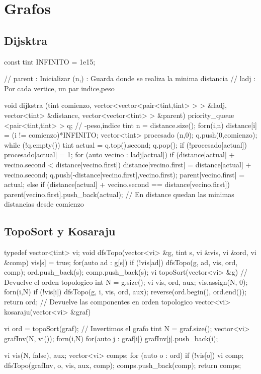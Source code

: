 \section{Grafos}

\subsection{Dijsktra}
\begin{code}
const tint INFINITO = 1e15;

// parent : Inicializar (n,{}) : Guarda donde se realiza la minima distancia
// ladj : Por cada vertice, un par {indice,peso}

void dijkstra (tint comienzo, vector<vector<pair<tint,tint> > > &ladj, 
vector<tint> &distance, vector<vector<tint> > &parent) {
	priority_queue <pair<tint,tint> > q; // {-peso,indice}
	tint n = distance.size();
	forn(i,n)
		distance[i] = (i != comienzo)*INFINITO;
	vector<tint> procesado (n,0);
	q.push({0,comienzo});
	while (!q.empty()) {
		tint actual = q.top().second;
		q.pop();
		if (!procesado[actual]) {
			procesado[actual] = 1;
			for (auto vecino : ladj[actual]) {
				if (distance[actual] + vecino.second < distance[vecino.first]) {
					distance[vecino.first] = distance[actual] + vecino.second;
					q.push({-distance[vecino.first],vecino.first});
					parent[vecino.first] = {actual};
				}
				else if (distance[actual] + vecino.second == distance[vecino.first])
					parent[vecino.first].push_back(actual);
			}
		}
	}
}
// En distance quedan las minimas distancias desde comienzo
\end{code}

\subsection{TopoSort y Kosaraju}
\begin{code}
typedef vector<tint> vi;
void dfsTopo(vector<vi> &g, tint s, vi &vis, vi &ord, vi &comp) {
	vis[s] = true;
	for(auto ad : g[s]) if (!vis[ad]) dfsTopo(g, ad, vis, ord, comp);
	ord.push_back(s);
	comp.push_back(s);
}
vi topoSort(vector<vi> &g) { // Devuelve el orden topologico
  int N = g.size();
  vi vis, ord, aux;
	vis.assign(N, 0);
	forn(i,N) if (!vis[i]) dfsTopo(g, i, vis, ord, aux);
	reverse(ord.begin(), ord.end());
  return ord;
}
// Devuelve las componentes en orden topologico
vector<vi> kosaraju(vector<vi> &graf) { 
	vi ord = topoSort(graf);
  // Invertimos el grafo
  tint N = graf.size();
  vector<vi> grafInv(N, vi());
  forn(i,N) for(auto j : graf[i]) grafInv[j].push_back(i);
  
  vi vis(N, false), aux;
  vector<vi> comps;
	for (auto o : ord)
  if (!vis[o]) {
    vi comp; dfsTopo(grafInv, o, vis, aux, comp);
    comps.push_back(comp);
  }
	return comps;
}
\end{code}

